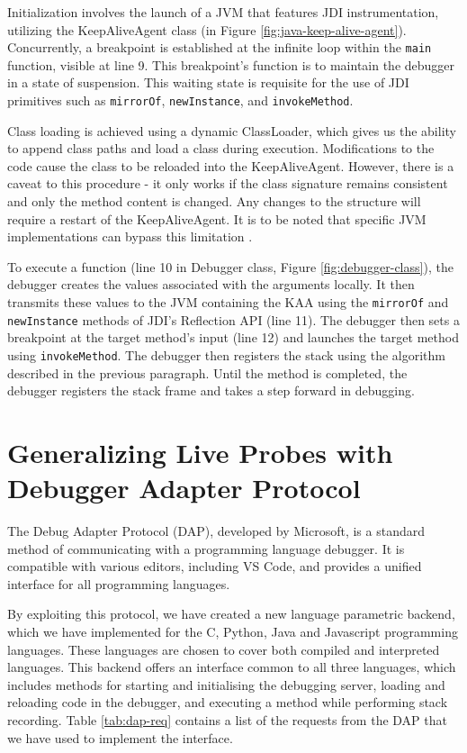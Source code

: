 \documentclass[english,submission]{programming}
\newcommand{\code}[1]{\colorbox{codegray}{\texttt{#1}}}
\begin{document}
Initialization involves the launch of a JVM that features JDI instrumentation, utilizing the KeepAliveAgent class (in Figure \ref{fig:java-keep-alive-agent}). 
Concurrently, a breakpoint is established at the infinite loop within the \code{main} function, visible at line 9. 
This breakpoint's function is to maintain the debugger in a state of suspension. This waiting state is requisite for the use of JDI primitives such as \code{mirrorOf}, \code{newInstance}, and \code{invokeMethod}.

Class loading is achieved using a dynamic ClassLoader, which gives us the ability to append class paths and load a class during execution. 
Modifications to the code cause the class to be reloaded into the KeepAliveAgent. 
However, there is a caveat to this procedure - it only works if the class signature remains consistent and only the method content is changed. 
Any changes to the structure will require a restart of the KeepAliveAgent. 
It is to be noted that specific JVM implementations can bypass this limitation \cite{}.

To execute a function (line 10 in Debugger class, Figure \ref{fig:debugger-class}), the debugger creates the values associated with the arguments locally. 
It then transmits these values to the JVM containing the KAA using the \code{mirrorOf} and \code{newInstance} methods of JDI's Reflection API (line 11). 
The debugger then sets a breakpoint at the target method's input (line 12) and launches the target method using \code{invokeMethod}. 
The debugger then registers the stack using the algorithm described in the previous paragraph.
Until the method is completed, the debugger registers the stack frame and takes a step forward in debugging.

\section{Generalizing Live Probes with Debugger Adapter Protocol}
\label{sec:generalizing-live-probes}
The Debug Adapter Protocol (DAP), developed by Microsoft, is a standard method of communicating with a programming language debugger. It is compatible with various editors, including VS Code, and provides a unified interface for all programming languages. 

By exploiting this protocol, we have created a new language parametric backend, which we have implemented for the C, Python, Java and Javascript programming languages. These languages are chosen to cover both compiled and interpreted languages. 
This backend offers an interface common to all three languages, which includes methods for starting and initialising the debugging server, loading and reloading code in the debugger, and executing a method while performing stack recording. 
Table \ref{tab:dap-req} contains a list of the requests from the DAP that we have used to implement the interface.
\end{document}
